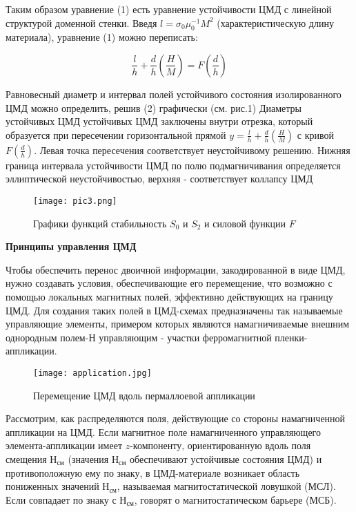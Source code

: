 \documentclass[a4paper,12pt]{report}
\begin{document}
Таким образом уравнение (1) есть уравнение устойчивости ЦМД с линейной структурой доменной стенки. Введя $l = \sigma_{0}\mu_{0}^{-1}M^2$ (характеристическую длину материала), уравнение (1) можно переписать:

\begin{equation}
    \frac{l}{h} + \frac{d}{h}(\frac{H}{M}) = F(\frac{d}{h})
\end{equation}

Равновесный диаметр и интервал полей устойчивого состояния изолированного ЦМД можно определить, решив (2) графически (см. рис.1) Диаметры устойчивых ЦМД устойчивых ЦМД заключены внутри отрезка, который образуется при пересечении горизонтальной прямой $y = \frac{l}{h} + \frac{d}{h}(\frac{H}{M})$ с кривой $F(\frac{d}{h})$. Левая точка пересечения соответствует неустойчивому решению. Нижняя граница интервала устойчивости ЦМД по полю подмагничивания определяется $\textit{эллиптической неустойчивостью}$, верхняя - соответствует $\textit{коллапсу ЦМД}$

\begin{figure}[H]
\centering
\texttt{[image: pic3.png]}
\caption{Графики функций стабильность $S_{0}$ и $S_{2}$ и силовой функции $F$}
\end{figure}

\textbf{Принципы управления ЦМД}

Чтобы обеспечить перенос двоичной информации, закодированной в виде ЦМД, нужно создавать условия, обеспечивающие его перемещение, что возможно с помощью локальных магнитных полей, эффективно действующих на границу ЦМД. Для создания таких полей в ЦМД-схемах предназначены так называемые управляющие элементы, примером которых являются намагничиваемые внешним однородным полем-Н управляющим - участки ферромагнитной пленки-аппликации.

\begin{figure}[H]
\centering
\texttt{[image: application.jpg]}
\caption{Перемещение ЦМД вдоль пермаллоевой аппликации}
\end{figure}

Рассмотрим, как распределяются поля, действующие со стороны намагниченной аппликации на ЦМД. Если магнитное поле намагниченного управляющего элемента-аппликации имеет $z$-компоненту, ориентированную вдоль поля смещения Н$_{\text{см}}$ (значения Н$_{\text{см}}$ обеспечивают устойчивые состояния ЦМД) и противоположную ему по знаку, в ЦМД-материале возникает область пониженных значений Н$_{\text{см}}$, называемая магнитостатической ловушкой (МСЛ). Если совпадает по знаку с Н$_{\text{см}}$, говорят о магнитостатическом барьере (МСБ). 
\end{document}
